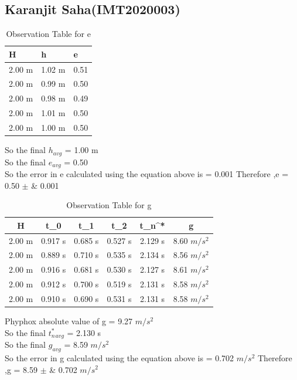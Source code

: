 \documentclass[11pt]{scrartcl} %
\begin{document}
\subsection{Karanjit Saha(IMT2020003)}

\begin{table}[h] %
	\centering %
	\begin{tabular}{l l l}
		\toprule
		\textbf{H} & \textbf{h} & \textbf{e} \\
		\midrule
		2.00 m & 1.02 m & 0.51\\
		2.00 m & 0.99 m  & 0.50\\
		2.00 m & 0.98 m  & 0.49\\
		2.00 m & 1.01 m & 0.50 \\
		2.00 m & 1.00 m & 0.50 \\
		\bottomrule
	\end{tabular}
	\caption{Observation Table for e}
\end{table}
So the final $h_{avg}$ = 1.00 m\\
So the final $e_{avg}$ = 0.50\\
So the error in e calculated using the equation above is  = 0.001 \newline
Therefore ,e = 0.50  $\pm$ &  0.001 \\

\begin{table}[h]
\centering
\begin{tabular}{||c c c c c c||} 
\toprule
 \hline
 H & t_0 & t_1 & t_2 & t_n^* & g \\ [0.5ex] 
 \midrule
 \hline\hline
 2.00 m & 0.917 s & 0.685 s  & 0.527 s & 2.129 s & 8.60 $m/s^2$  \\ 
 \hline
 2.00 m & 0.889 s & 0.710 s & 0.535 s & 2.134 s & 8.56 $m/s^2$  \\
 \hline
 2.00 m & 0.916 s & 0.681 s & 0.530 s & 2.127 s  & 8.61 $m/s^2$   \\
 \hline
 2.00 m & 0.912 s & 0.700 s & 0.519 s & 2.131 s  & 8.58 $m/s^2$   \\
 \hline
 2.00 m & 0.910 s & 0.690 s & 0.531 s & 2.131 s  & 8.58 $m/s^2$  \\ [1ex] 
 \bottomrule
 \hline
\end{tabular}
\caption{Observation Table for g}
\end{table}
Phyphox absolute value of g = 9.27 $m/s^2$\\
So the final $t_n^*_{avg}$ = 2.130 s\\
So the final $g_{avg}$ = 8.59 $m/s^2$\\
So the error in g calculated using the equation above is  = 0.702 $m/s^2$ \newline
Therefore ,g = 8.59  $\pm$ &  0.702 $m/s^2$ \\
\end{document}

